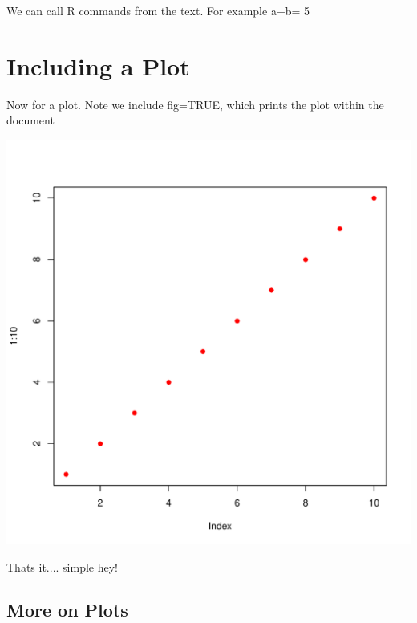 We can call R commands from the text. For example a+b= 5

\section{Including a Plot}
Now for a plot.  Note we include fig=TRUE, which prints the plot within the document


\begin{knitrout}
\color{fgcolor}\begin{kframe}
\begin{alltt}
\hlstd{(}\hlopt{:}\hlstd{,} \hlstd{=}\hlstd{,} \hlstd{=}\hlstd{)}
\end{alltt}
\end{kframe}
\includegraphics[width=\maxwidth]{figure/test2-1} 

\end{knitrout}

Thats it.... simple hey!


\subsection{More on Plots}

